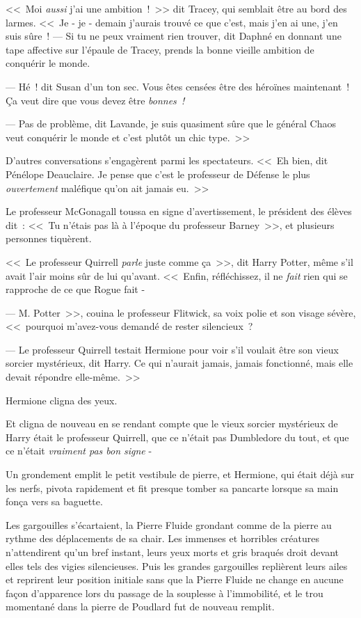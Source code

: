 <<~Moi \emph{aussi} j'ai une ambition~!~>> dit Tracey, qui semblait être au bord des larmes. <<~Je - je - demain j'aurais trouvé ce que c'est, mais j'en ai une, j'en suis sûre~!
--- Si tu ne peux vraiment rien trouver, dit Daphné en donnant une tape affective sur l'épaule de Tracey, prends la bonne vieille ambition de conquérir le monde.

--- Hé~! dit Susan d'un ton sec. Vous êtes censées être des héroïnes maintenant~! Ça veut dire que vous devez être \emph{bonnes~!}

--- Pas de problème, dit Lavande, je suis quasiment sûre que le général Chaos veut conquérir le monde et c'est plutôt un chic type.~>>

D'autres conversations s'engagèrent parmi les spectateurs. <<~Eh bien, dit Pénélope Deauclaire. Je pense que c'est le professeur de Défense le plus \emph{ouvertement} maléfique qu'on ait jamais eu.~>>

Le professeur McGonagall toussa en signe d'avertissement, le président des élèves dit~: <<~Tu n'étais pas là à l'époque du professeur Barney~>>, et plusieurs personnes tiquèrent.

<<~Le professeur Quirrell \emph{parle} juste comme ça~>>, dit Harry Potter, même s'il avait l'air moins sûr de lui qu'avant. <<~Enfin, réfléchissez, il ne \emph{fait} rien qui se rapproche de ce que Rogue fait -

--- M. Potter~>>, couina le professeur Flitwick, sa voix polie et son visage sévère, <<~pourquoi m'avez-vous demandé de rester silencieux~?

--- Le professeur Quirrell testait Hermione pour voir s'il voulait être son vieux sorcier mystérieux, dit Harry. Ce qui n'aurait jamais, jamais fonctionné, mais elle devait répondre elle-même.~>>

Hermione cligna des yeux.

Et cligna de nouveau en se rendant compte que le vieux sorcier mystérieux de Harry était le professeur Quirrell, que ce n'était pas Dumbledore du tout, et que ce n'était \emph{vraiment pas bon signe} -

Un grondement emplit le petit vestibule de pierre, et Hermione, qui était déjà sur les nerfs, pivota rapidement et fit presque tomber sa pancarte lorsque sa main fonça vers sa baguette.

Les gargouilles s'écartaient, la Pierre Fluide grondant comme de la pierre au rythme des déplacements de sa chair. Les immenses et horribles créatures n'attendirent qu'un bref instant, leurs yeux morts et gris braqués droit devant elles tels des vigies silencieuses. Puis les grandes gargouilles replièrent leurs ailes et reprirent leur position initiale sans que la Pierre Fluide ne change en aucune façon d'apparence lors du passage de la souplesse à l'immobilité, et le trou momentané dans la pierre de Poudlard fut de nouveau remplit.

